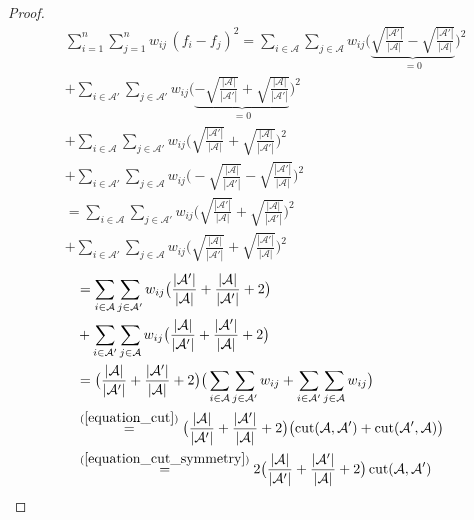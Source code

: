 \documentclass[lang=cn,10pt]{gorgeousnbook}
\numberwithin{equation}{section}%
\numberwithin{figure}{section}%
\begin{document}
\begin{proof}
\begin{align*}
&\sum_{i=1}^n \sum_{j=1}^n w_{ij}\, (f_i - f_j)^2 = \sum_{i \in \mathcal{A}} \sum_{j \in \mathcal{A}} w_{ij} \big(\underbrace{\sqrt{\frac{|\mathcal{A}'|}{|\mathcal{A}|}} - \sqrt{\frac{|\mathcal{A}'|}{|\mathcal{A}|}}}_{=0}\big)^2 \\
& + \sum_{i \in \mathcal{A}'} \sum_{j \in \mathcal{A}'} w_{ij} \big(\underbrace{-\sqrt{\frac{|\mathcal{A}|}{|\mathcal{A}'|}} + \sqrt{\frac{|\mathcal{A}|}{|\mathcal{A}'|}}}_{=0}\big)^2 \\
&+ \sum_{i \in \mathcal{A}} \sum_{j \in \mathcal{A}'} w_{ij} \big(\sqrt{\frac{|\mathcal{A}'|}{|\mathcal{A}|}} + \sqrt{\frac{|\mathcal{A}|}{|\mathcal{A}'|}}\big)^2 \\
& +\sum_{i \in \mathcal{A}'} \sum_{j \in \mathcal{A}} w_{ij} \big(-\sqrt{\frac{|\mathcal{A}|}{|\mathcal{A}'|}} - \sqrt{\frac{|\mathcal{A}'|}{|\mathcal{A}|}}\big)^2 \\
&= \sum_{i \in \mathcal{A}} \sum_{j \in \mathcal{A}'} w_{ij} \big(\sqrt{\frac{|\mathcal{A}'|}{|\mathcal{A}|}} + \sqrt{\frac{|\mathcal{A}|}{|\mathcal{A}'|}}\big)^2 \\
&+ \sum_{i \in \mathcal{A}'} \sum_{j \in \mathcal{A}} w_{ij} \big(\sqrt{\frac{|\mathcal{A}|}{|\mathcal{A}'|}} + \sqrt{\frac{|\mathcal{A}'|}{|\mathcal{A}|}}\big)^2 
\end{align*}
\begin{align*}
&= \sum_{i \in \mathcal{A}} \sum_{j \in \mathcal{A}'} w_{ij} \big(\frac{|\mathcal{A}'|}{|\mathcal{A}|} + \frac{|\mathcal{A}|}{|\mathcal{A}'|} + 2\big) \\
&+ \sum_{i \in \mathcal{A}'} \sum_{j \in \mathcal{A}} w_{ij} \big(\frac{|\mathcal{A}|}{|\mathcal{A}'|} + \frac{|\mathcal{A}'|}{|\mathcal{A}|} + 2\big) \\
&= \big(\frac{|\mathcal{A}|}{|\mathcal{A}'|} + \frac{|\mathcal{A}'|}{|\mathcal{A}|} + 2\big) \big( \sum_{i \in \mathcal{A}} \sum_{j \in \mathcal{A}'} w_{ij} + \sum_{i \in \mathcal{A}'} \sum_{j \in \mathcal{A}} w_{ij} \big) \\
&\overset{(\ref{equation_cut})}{=} \big(\frac{|\mathcal{A}|}{|\mathcal{A}'|} + \frac{|\mathcal{A}'|}{|\mathcal{A}|} + 2\big) \big( \text{cut}(\mathcal{A}, \mathcal{A}') + \text{cut}(\mathcal{A}', \mathcal{A}) \big) \\
&\overset{(\ref{equation_cut_symmetry})}{=} 2 \big(\frac{|\mathcal{A}|}{|\mathcal{A}'|} + \frac{|\mathcal{A}'|}{|\mathcal{A}|} + 2\big)\, \text{cut}(\mathcal{A}, \mathcal{A}')
\end{align*}

\end{proof}
\end{document}
